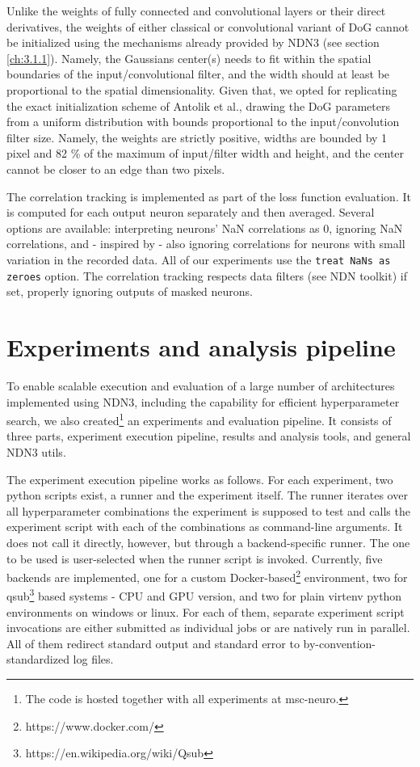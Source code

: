 Unlike the weights of fully connected and convolutional layers or their direct derivatives, the weights of either classical or convolutional variant of DoG cannot be initialized using the mechanisms already provided by NDN3 (see section \ref{ch:3.1.1}). Namely, the Gaussians center(s) needs to fit within the spatial boundaries of the input/convolutional filter, and the width should at least be proportional to the spatial dimensionality. Given that, we opted for replicating the exact initialization scheme of Antolik et al., drawing the DoG parameters from a uniform distribution with bounds proportional to the input/convolution filter size. Namely, the weights are strictly positive, widths are bounded by 1 pixel and 82 \% of the maximum of input/filter width and height, and the center cannot be closer to an edge than two pixels. 

The correlation tracking is implemented as part of the loss function evaluation. It is computed for each output neuron separately and then averaged. Several options are available: interpreting neurons’ NaN correlations as 0, ignoring NaN correlations, and - inspired by \cite{ecker} - also ignoring correlations for neurons with small variation in the recorded data. All of our experiments use the \texttt{treat NaNs as zeroes} option. The correlation tracking respects data filters (see NDN toolkit) if set, properly ignoring outputs of masked neurons.

\section{Experiments and analysis pipeline}

To enable scalable execution and evaluation of a large number of architectures implemented using NDN3, including the capability for efficient hyperparameter search, we also created\footnote{The code is hosted together with all experiments at msc-neuro.} an experiments and evaluation pipeline. It consists of three parts, experiment execution pipeline, results and analysis tools, and general NDN3 utils.

The experiment execution pipeline works as follows. For each experiment, two python scripts exist, a runner and the experiment itself. The runner iterates over all hyperparameter combinations the experiment is supposed to test and calls the experiment script with each of the combinations as command-line arguments. It does not call it directly, however, but through a backend-specific runner. The one to be used is user-selected when the runner script is invoked. Currently, five backends are implemented, one for a custom Docker-based\footnote{https://www.docker.com/} environment, two for qsub\footnote{https://en.wikipedia.org/wiki/Qsub} based systems - CPU and GPU version, and two for plain virtenv python environments on windows or linux. For each of them, separate experiment script invocations are either submitted as individual jobs or are natively run in parallel. All of them redirect standard output and standard error to by-convention-standardized log files.

